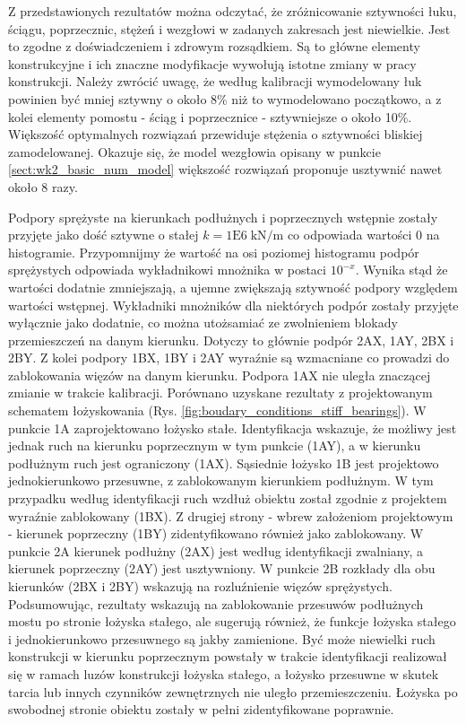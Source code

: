 Z przedstawionych rezultatów można odczytać, że zróżnicowanie sztywności łuku, ściągu, poprzecznic, stężeń i wezgłowi w zadanych zakresach jest niewielkie. Jest to zgodne z doświadczeniem i zdrowym rozsądkiem. Są to główne elementy konstrukcyjne i ich znaczne modyfikacje wywołują istotne zmiany w pracy konstrukcji. Należy zwrócić uwagę, że według kalibracji wymodelowany łuk powinien być mniej sztywny o około 8\% niż to wymodelowano początkowo, a z kolei elementy pomostu - ściąg i poprzecznice - sztywniejsze o około 10\%. Większość optymalnych rozwiązań przewiduje stężenia o sztywności bliskiej zamodelowanej. Okazuje się, że model wezgłowia opisany w punkcie \ref{sect:wk2_basic_num_model} większość rozwiązań proponuje usztywnić nawet około 8 razy. 

Podpory sprężyste na kierunkach podłużnych i poprzecznych wstępnie zostały przyjęte jako dość sztywne o stałej $k=1\mathrm{E}6\;\mathrm{kN/m}$ co odpowiada wartości 0 na histogramie. Przypomnijmy że wartość na osi poziomej histogramu podpór sprężystych odpowiada wykładnikowi mnożnika w postaci $10^{-x}$. Wynika stąd że wartości dodatnie zmniejszają, a ujemne zwiększają sztywność podpory względem wartości wstępnej. Wykładniki mnożników dla niektórych podpór zostały przyjęte wyłącznie jako dodatnie, co można utożsamiać ze zwolnieniem blokady przemieszczeń na danym kierunku. Dotyczy to głównie podpór 2AX, 1AY, 2BX i 2BY. Z kolei podpory 1BX, 1BY i 2AY wyraźnie są wzmacniane co prowadzi do zablokowania więzów na danym kierunku. Podpora 1AX nie uległa znaczącej zmianie w trakcie kalibracji. Porównano uzyskane rezultaty z projektowanym schematem łożyskowania (Rys. \ref{fig:boudary_conditions_stiff_bearings}). W punkcie 1A zaprojektowano łożysko stałe. Identyfikacja wskazuje, że możliwy jest jednak ruch na kierunku poprzecznym w tym punkcie (1AY), a w kierunku podłużnym ruch jest ograniczony (1AX). Sąsiednie łożysko 1B jest projektowo jednokierunkowo przesuwne, z zablokowanym kierunkiem podłużnym. W tym przypadku według identyfikacji ruch wzdłuż obiektu został zgodnie z projektem wyraźnie zablokowany (1BX). Z drugiej strony - wbrew założeniom projektowym - kierunek poprzeczny (1BY) zidentyfikowano również jako zablokowany. W punkcie 2A kierunek podłużny (2AX) jest według identyfikacji zwalniany, a kierunek poprzeczny (2AY) jest usztywniony. W punkcie 2B rozkłady dla obu kierunków (2BX i 2BY) wskazują na rozluźnienie więzów sprężystych. Podsumowując, rezultaty wskazują na zablokowanie przesuwów podłużnych mostu po stronie łożyska stałego, ale sugerują również, że funkcje łożyska stałego i jednokierunkowo przesuwnego są jakby zamienione. Być może niewielki ruch konstrukcji w kierunku poprzecznym powstały w trakcie identyfikacji realizował się w ramach luzów konstrukcji łożyska stałego, a łożysko przesuwne w skutek tarcia lub innych czynników zewnętrznych nie uległo przemieszczeniu. Łożyska po swobodnej stronie obiektu zostały w pełni zidentyfikowane poprawnie.


